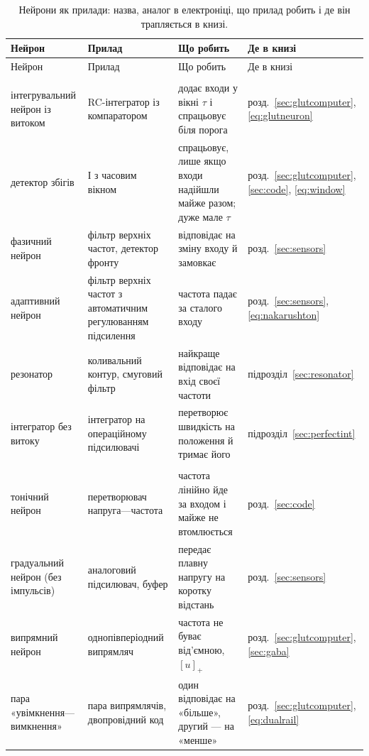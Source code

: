 \begin{center}
\footnotesize
\setlength{\tabcolsep}{3pt}
\renewcommand{\arraystretch}{1.15}
\begin{longtable}{>{\raggedright}p{3.1cm}>{\raggedright}p{3.3cm}>{\raggedright}p{4.7cm}>{\raggedright\arraybackslash}p{2.4cm}}
\caption{Нейрони як прилади: назва, аналог в електроніці, що прилад робить і де він трапляється в книзі.}\label{tab:eetypes}\\
\toprule
Нейрон & Прилад & Що робить & Де в книзі \\
\midrule
\endfirsthead
\toprule
Нейрон & Прилад & Що робить & Де в книзі \\
\midrule
\endhead
\bottomrule
\endfoot
\multicolumn{4}{l}{\emph{Фільтри й інтегратори}} \\
інтегрувальний нейрон із витоком & RC-інтегратор із компаратором & додає входи у вікні $\tau$ і спрацьовує біля порога & розд.~\ref{sec:glutcomputer}, \eqref{eq:glutneuron} \\
детектор збігів & І з часовим вікном & спрацьовує, лише якщо входи надійшли майже разом; дуже мале $\tau$ & розд.~\ref{sec:glutcomputer}, \ref{sec:code}, \eqref{eq:window} \\
фазичний нейрон & фільтр верхніх частот, детектор фронту & відповідає на зміну входу й замовкає & розд.~\ref{sec:sensors} \\
адаптивний нейрон & фільтр верхніх частот з автоматичним регулюванням підсилення & частота падає за сталого входу & розд.~\ref{sec:sensors}, \eqref{eq:nakarushton} \\
резонатор & коливальний контур, смуговий фільтр & найкраще відповідає на вхід своєї частоти & підрозділ~\ref{sec:resonator} \\
інтегратор без витоку & інтегратор на операційному підсилювачі & перетворює швидкість на положення й тримає його & підрозділ~\ref{sec:perfectint} \\
\midrule
\multicolumn{4}{l}{\emph{Перетворювачі}} \\
тонічний нейрон & перетворювач напруга---частота & частота лінійно йде за входом і майже не втомлюється & розд.~\ref{sec:code} \\
градуальний нейрон (без імпульсів) & аналоговий підсилювач, буфер & передає плавну напругу на коротку відстань & розд.~\ref{sec:sensors} \\
випрямний нейрон & однопівперіодний випрямляч & частота не буває від'ємною, $[u]_+$ & розд.~\ref{sec:glutcomputer}, \ref{sec:gaba} \\
пара «увімкнення---вимкнення» & пара випрямлячів, двопровідний код & один відповідає на «більше», другий --- на «менше» & розд.~\ref{sec:glutcomputer}, \eqref{eq:dualrail} \\

\end{longtable}
\end{center}
